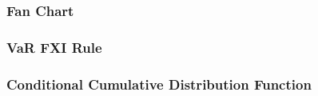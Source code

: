\documentclass{beamer}
\begin{document}
\begin{frame}
 \frametitle{Fan Chart}
\end{frame}

\begin{frame}
  \frametitle{VaR FXI Rule}
\end{frame}

\begin{frame}
  \frametitle{Conditional Cumulative Distribution Function}
\end{frame}
\end{document}
